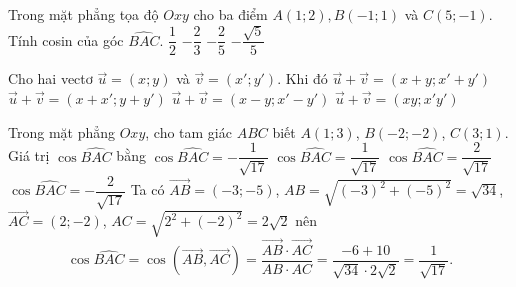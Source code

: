 \begin{ex}%
	Trong mặt phẳng tọa độ $Oxy$ cho ba điểm $A(1;2), B(-1;1)$ và $C(5;-1)$. Tính cosin của góc $\widehat{BAC}$.
	\choice
	{$\dfrac{1}{2}$}
	{$-\dfrac{2}{3}$}
	{$-\dfrac{2}{5}$}
	{\True $-\dfrac{\sqrt{5}}{5}$}
\end{ex}
\begin{ex}
	Cho hai vectơ $\vec{u}=(x;y)$ và $\vec{v}=(x';y')$. Khi đó
	\choice
	{$\vec{u}+\vec{v}=(x+y;x'+y')$}
	{\True $\vec{u}+\vec{v}=(x+x';y+y')$}
	{$\vec{u}+\vec{v}=(x-y;x'-y')$}
	{$\vec{u}+\vec{v}=(xy;x'y')$}
\end{ex}
\begin{ex}%
	Trong mặt phẳng $Oxy$, cho tam giác $ABC$ biết $A(1; 3)$, $B(-2;-2)$, $C(3; 1)$. Giá trị $\cos\widehat{BAC}$ bằng
	\choice
	{$\cos\widehat{BAC}=-\dfrac{1}{\sqrt{17}}$}
	{\True $\cos\widehat{BAC}=\dfrac{1}{\sqrt{17}}$}
	{$\cos\widehat{BAC}=\dfrac{2}{\sqrt{17}}$}
	{$\cos\widehat{BAC}=-\dfrac{2}{\sqrt{17}}$}
	\loigiai
	{Ta có $\overrightarrow{AB}=(-3;-5)$, $AB=\sqrt{(-3)^2+(-5)^2} = \sqrt{34}$, $\overrightarrow{AC}=(2;-2)$, $AC=\sqrt{2^2+(-2)^2}=2\sqrt{2}$ nên
		\[\cos\widehat{BAC}=\cos\left(\overrightarrow{AB},\overrightarrow{AC}\right) = \dfrac{\overrightarrow{AB}\cdot \overrightarrow{AC}}{AB\cdot AC} = \dfrac{-6+10}{\sqrt{34}\cdot 2\sqrt{2}} = \dfrac{1}{\sqrt{17}}.\]}
\end{ex}
